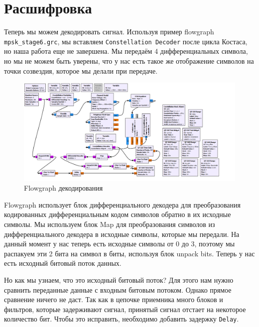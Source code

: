 \documentclass[a4paper, 14pt]{extarticle}
\begin{document}
    \newpage


    \section{Расшифровка}
    \label{sec:7}

    Теперь мы можем декодировать сигнал.
    Используя пример flowgraph \texttt{mpsk\_stage6.grc}, мы вставляем \texttt{Constellation Decoder} после цикла Костаса, но наша работа еще не завершена.
    Мы передаём 4 дифференциальных символа, но мы не можем быть уверены, что у нас есть такое же отображение символов на точки созвездия, которое мы делали при передаче.

    \begin{figure}[H]
        \centering
        \includegraphics[width=0.8\linewidth]{flowgraph_decoder}
        \caption{Flowgraph декодирования}
        \label{fig:flowgraph_decoder}
    \end{figure}

    Flowgraph использует блок дифференциального декодера для преобразования кодированных дифференциальным кодом символов обратно в их исходные символы.
    Мы используем блок Map для преобразования символов из дифференциального декодера в исходные символы, которые мы передали.
    На данный момент у нас теперь есть исходные символы от 0 до 3, поэтому мы распакуем эти 2 бита на символ в биты, используя блок unpack bits.
    Теперь у нас есть исходный битовый поток данных.

    Но как мы узнаем, что это исходный битовый поток?
    Для этого нам нужно сравнить переданные данные с входным битовым потоком. Однако прямое сравнение ничего не даст.
    Так как в цепочке приемника много блоков и фильтров, которые задерживают сигнал, принятый сигнал отстает на некоторое количество бит.
    Чтобы это исправить, необходимо добавить задержку \texttt{Delay}.
\end{document}

